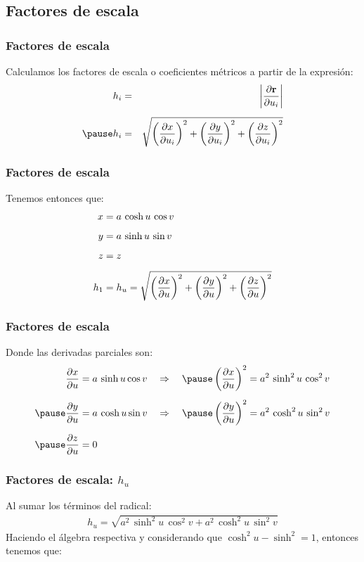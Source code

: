 \documentclass[12pt]{beamer}
\begin{document}
\subsection{Factores de escala}

\begin{frame}
\frametitle{Factores de escala}
Calculamos los factores de escala o coeficientes métricos a partir de la expresión:
\pause
\begin{eqnarray*}
h_{i} &=& \abs{\pdv{\vb{r}}{u_{i}}} \\[0.5em] \pause
h_{i} &=& \sqrt{ \left( \pdv{x}{u_{i}} \right)^{2} + \left( \pdv{y}{u_{i}} \right)^{2} + \left( \pdv{z}{u_{i}} \right)^{2}}
\end{eqnarray*}
\end{frame}
\begin{frame}
\frametitle{Factores de escala}
Tenemos entonces que:
\pause
\begin{align*}
x &= a \, \cosh u \, \cos v \\[0.5em]
y &= a \, \sinh u \, \sin v \\[0.5em]
z &= z \\[0.5em]
h_{1} &= h_{u} = \sqrt{ \left( \pdv{x}{u} \right)^{2} + \left( \pdv{y}{u} \right)^{2} + \left( \pdv{z}{u} \right)^{2}}
\end{align*}
\end{frame}
\begin{frame}
\frametitle{Factores de escala}
Donde las derivadas parciales son:
\pause
\begin{eqnarray*}
\begin{aligned}
\pdv{x}{u} &= a \, \sinh u \cos v \hspace{0.35cm} \Rightarrow \hspace{0.35cm} \pause \left( \pdv{x}{u} \right)^{2} = a^{2} \, \sinh^{2} u \, \cos^{2} v \\[0.5em] \pause 
\pdv{y}{u} &= a \, \cosh u \sin v \hspace{0.35cm} \Rightarrow \hspace{0.35cm} \pause \left( \pdv{y}{u} \right)^{2} = a^{2} \, \cosh^{2} u \, \sin^{2} v \\[0.5em] \pause 
\pdv{z}{u} &= 0
\end{aligned}
\end{eqnarray*}
\end{frame}
\begin{frame}
\frametitle{Factores de escala: $h_{u}$}
Al sumar los términos del radical:
\pause
\begin{align*}
h_{u} = \sqrt{a^{2} \, \sinh^{2} u \, \cos^{2} v + a^{2} \, \cosh^{2} u \, \sin^{2} v}
\end{align*}
\pause
Haciendo el álgebra respectiva y considerando que $\cosh^{2} u - \sinh^{2} = 1$, entonces tenemos que:
\end{frame}
\end{document}
